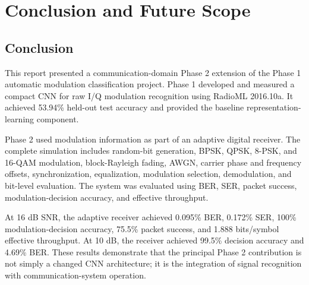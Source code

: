 \chapter{Conclusion and Future Scope}

\section{Conclusion}
This report presented a communication-domain Phase 2 extension of the Phase 1
automatic modulation classification project. Phase 1 developed and measured a
compact CNN for raw I/Q modulation recognition using RadioML 2016.10a. It
achieved 53.94\% held-out test accuracy and provided the baseline
representation-learning component.

Phase 2 used modulation information as part of an adaptive digital receiver.
The complete simulation includes random-bit generation, BPSK, QPSK, 8-PSK,
and 16-QAM modulation, block-Rayleigh fading, AWGN, carrier phase and
frequency offsets, synchronization, equalization, modulation selection,
demodulation, and bit-level evaluation. The system was evaluated using BER,
SER, packet success, modulation-decision accuracy, and effective throughput.

At 16 dB SNR, the adaptive receiver achieved 0.095\% BER, 0.172\% SER, 100\%
modulation-decision accuracy, 75.5\% packet success, and 1.888 bits/symbol
effective throughput. At 10 dB, the receiver achieved 99.5\% decision
accuracy and 4.69\% BER. These results demonstrate that the principal Phase 2
contribution is not simply a changed CNN architecture; it is the integration
of signal recognition with communication-system operation.


